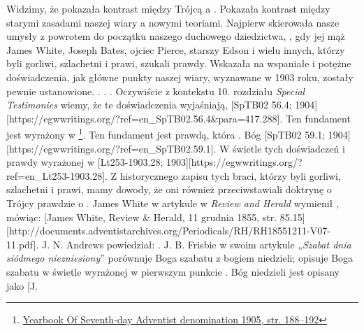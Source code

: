 Widzimy, że pokazała kontrast między Trójcą a . Pokazała kontrast między starymi zasadami naszej wiary a nowymi teoriami. Najpierw skierowała nasze umysły z powrotem do początku naszego duchowego dziedzictwa, , gdy jej mąż James White, Joseph Bates, ojciec Pierce, starszy Edson i wielu innych, którzy byli gorliwi, szlachetni i prawi, szukali prawdy. Wskazała na wspaniałe i potężne doświadczenia, jak główne punkty naszej wiary, wyznawane w 1903 roku, zostały pewnie ustanowione. . . . Oczywiście z kontekstu 10. rozdziału \textit{Special Testimonies} wiemy, że te doświadczenia wyjaśniają, [SpTB02 56.4; 1904][https://egwwritings.org/?ref=en\_SpTB02.56.4\&para=417.288]. Ten fundament jest wyrażony w \footnote{\href{https://static1.squarespace.com/static/554c4998e4b04e89ea0c4073/t/59d17e24c027d84167e17617/1506901547915/SDA-YB1905+\%28P.+188-192\%29.pdf}{Yearbook Of Seventh-day Adventist denomination 1905, str. 188--192}}. Ten fundament jest prawdą, która . Bóg [SpTB02 59.1; 1904][https://egwwritings.org/?ref=en\_SpTB02.59.1]. W świetle tych doświadczeń i prawdy wyrażonej w  [Lt253-1903.28; 1903][https://egwwritings.org/?ref=en\_Lt253-1903.28]. Z historycznego zapisu tych braci, którzy byli gorliwi, szlachetni i prawi, mamy dowody, że oni również przeciwstawiali doktrynę o Trójcy prawdzie o . James White w artykule w \textit{Review and Herald} wymienił , mówiąc: [James White, Review \& Herald, 11 grudnia 1855, str. 85.15][http://documents.adventistarchives.org/Periodicals/RH/RH18551211-V07-11.pdf]. J. N. Andrews powiedział: . J. B. Frisbie w swoim artykule „\textit{Szabat dnia siódmego niezniesiony}” porównuje Boga szabatu z bogiem niedzieli; opisuje Boga szabatu w świetle  wyrażonej w pierwszym punkcie . Bóg niedzieli jest opisany jako [J. 